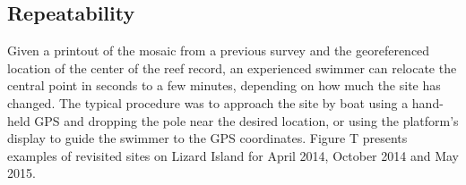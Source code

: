 
\subsection{Repeatability}
Given a printout of the mosaic from a previous survey and the georeferenced location of the center of the reef record, an experienced swimmer can relocate the central point in seconds to a few minutes, depending on how much the site has changed. The typical procedure was to approach the site by boat using a hand-held GPS and dropping the pole near the desired location, or using the platform's display to guide the swimmer to the GPS coordinates.
Figure T presents examples of revisited sites on Lizard Island for April 2014, October 2014 and May 2015.

